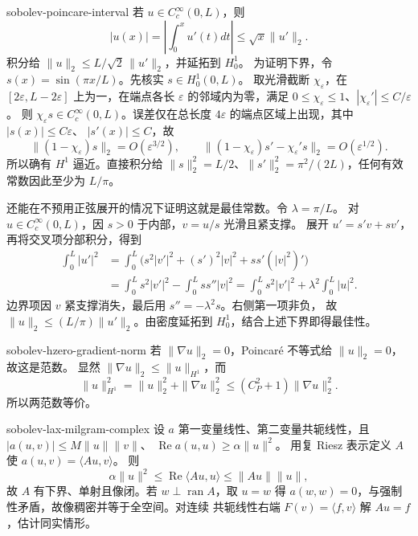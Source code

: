 \begin{solution}{sobolev-poincare-interval}
若 \(u\in C_c^\infty(0,L)\)，则
\[
 |u(x)|=\left|\int_0^xu'(t)dt\right|
 \le\sqrt{x}\|u'\|_2.
\]
积分给 \(\|u\|_2\le L/\sqrt2\,\|u'\|_2\)，并延拓到 \(H_0^1\)。
为证明下界，令 \(s(x)=\sin(\pi x/L)\)。先核实 \(s\in H_0^1(0,L)\)。
取光滑截断 \(\chi_\varepsilon\)，在 \([2\varepsilon,L-2\varepsilon]\)
上为一，在端点各长 \(\varepsilon\) 的邻域内为零，满足
\(0\le\chi_\varepsilon\le1\)、\(|\chi_\varepsilon'|\le C/\varepsilon\)。
则 \(\chi_\varepsilon s\in C_c^\infty(0,L)\)。误差仅在总长度
\(4\varepsilon\) 的端点区域上出现，其中 \(|s(x)|\le C\varepsilon\)、
\(|s'(x)|\le C\)，故
\[
 \|(1-\chi_\varepsilon)s\|_2=O(\varepsilon^{3/2}),\qquad
 \|(1-\chi_\varepsilon)s'-\chi_\varepsilon's\|_2=O(\varepsilon^{1/2}).
\]
所以确有 \(H^1\) 逼近。直接积分给
\(\|s\|_2^2=L/2\)、\(\|s'\|_2^2=\pi^2/(2L)\)，任何有效常数因此至少为 \(L/\pi\)。

还能在不预用正弦展开的情况下证明这就是最佳常数。令 \(\lambda=\pi/L\)。
对 \(u\in C_c^\infty(0,L)\)，因 \(s>0\) 于内部，\(v=u/s\) 光滑且紧支撑。
展开 \(u'=s'v+sv'\)，再将交叉项分部积分，得到
\[
 \begin{aligned}
 \int_0^L|u'|^2
 &=\int_0^L\bigl(s^2|v'|^2+(s')^2|v|^2+ss'(|v|^2)'\bigr)\\
 &=\int_0^Ls^2|v'|^2-\int_0^Lss''|v|^2
 =\int_0^Ls^2|v'|^2+\lambda^2\int_0^L|u|^2.
 \end{aligned}
\]
边界项因 \(v\) 紧支撑消失，最后用 \(s''=-\lambda^2s\)。右侧第一项非负，
故 \(\|u\|_2\le (L/\pi)\|u'\|_2\)。由密度延拓到 \(H_0^1\)，结合上述下界即得最佳性。
\end{solution}

\begin{solution}{sobolev-hzero-gradient-norm}
若 \(\|\nabla u\|_2=0\)，Poincaré 不等式给 \(\|u\|_2=0\)，故这是范数。
显然 \(\|\nabla u\|_2\le\|u\|_{H^1}\)，而
\[
 \|u\|_{H^1}^2=\|u\|_2^2+\|\nabla u\|_2^2
 \le(C_P^2+1)\|\nabla u\|_2^2.
\]
所以两范数等价。
\end{solution}

\begin{solution}{sobolev-lax-milgram-complex}
设 \(a\) 第一变量线性、第二变量共轭线性，且
\(|a(u,v)|\le M\|u\|\|v\|\)、
\(\operatorname{Re}a(u,u)\ge\alpha\|u\|^2\)。
用复 Riesz 表示定义 \(A\) 使 \(a(u,v)=\langle Au,v\rangle\)。
则
\[
 \alpha\|u\|^2\le\operatorname{Re}\langle Au,u\rangle
 \le\|Au\|\|u\|,
\]
故 \(A\) 有下界、单射且像闭。若 \(w\perp\operatorname{ran}A\)，取
\(u=w\) 得 \(a(w,w)=0\)，与强制性矛盾，故像稠密并等于全空间。对连续
共轭线性右端 \(F(v)=\langle f,v\rangle\) 解 \(Au=f\)，估计同实情形。
\end{solution}

